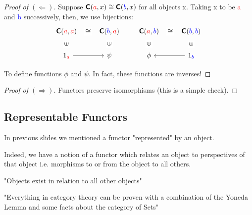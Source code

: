 \documentclass[tikz]{beamer}
\newcommand{\cat}[1]{\bm{ \mathsf{#1} }}
\newcommand{\cc}{\cat{C}}
\newcommand{\red}[1]{\textcolor{red}{#1}}
\newcommand{\blue}[1]{\textcolor{blue}{#1}}
\theoremstyle{definition}
\begin{document}
\begin{frame}[fragile]

	\begin{proof}[Proof of $(\Leftarrow)$]
		Suppose $\cc(\red{a}, x) \cong \cc(\blue{b}, x)$ for all objects x. Taking x to be \red{a} and \blue{b} successively, then, we use bijections: 
		\[
		\begin{aligned}
			\begin{tikzcd}[
  ar symbol/.style = {draw=none,"\textstyle#1" description,sloped},
  isomorphic/.style = {ar symbol={\cong}},
  inhabits/.style = {ar symbol={\in}}
  ]
				\cc(\red{a}, \red{a}) \ar[r, isomorphic] & \cc(\blue{b}, \red{a}) 
				\\ 1_{\red{a}}  \ar[u, inhabits] \ar[r] & \psi \ar[u, inhabits]
			\end{tikzcd}
			\qquad
			\begin{tikzcd}[
  ar symbol/.style = {draw=none,"\textstyle#1" description,sloped},
  isomorphic/.style = {ar symbol={\cong}},
    inhabits/.style = {ar symbol={\in}}
  ]
				\cc(\red{a}, \blue{b}) \ar[r, isomorphic] & \cc(\blue{b}, \blue{b})
				\\  \phi \ar[u, inhabits] & 1_{\blue{b}} \ar[u, inhabits]  \ar[l]
			\end{tikzcd}
		\end{aligned}
		\]
		
	To define functions $\phi$ and $\psi$. In fact, these functions are inverses!
	\end{proof}
\end{frame}


\frame
{
	\begin{proof}[Proof of $(\Rightarrow)$]
		Functors preserve isomorphisms (this is a simple check).
	\end{proof}
}

\subsection{Representable Functors}

\frame
{
	In previous slides we mentioned a functor "represented" by an object.
}


\frame
{
	Indeed, we have a notion of a functor which relates an object to perspectives of that object i.e. morphisms to or from the object to all others. 
}

\frame
{
	"Objects exist in relation to all other objects" 
}

\frame
{
	"Everything in category theory can be proven with a combination of the Yoneda Lemma and some facts about the category of Sets" 
}
\end{document}
